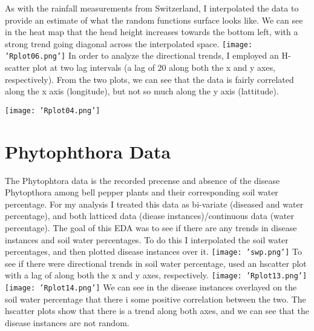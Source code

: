 \documentclass[12pt]{article}
\begin{document}
As with the rainfall measurements from Switzerland, I interpolated the data to provide an estimate of what the random functions surface looks like. We can see in the heat map that the head height increases towards the bottom left, with a strong trend going diagonal across the interpolated space.
\newline
\texttt{[image: 'Rplot06.png']}
\newline
In order to analyze the directional trends, I employed an H-scatter plot at two lag intervals (a lag of 20 along both the x and y axes, respectively). From the two plots, we can see that the data is fairly correlated along the x axis (longitude), but not so much along the y axis (lattitude).

\newline
{}
\newline
\texttt{[image: 'Rplot04.png']}
\newline

\section*{Phytophthora Data}
The Phytophtora data is the recorded precense and absence of the disease Phytopthora among bell pepper plants and their corresponding soil water percentage. For my analysis I treated this data as bi-variate (diseased and water percentage), and both latticed data (diease instances)/continuous data (water percentage). The goal of this EDA was to see if there are any trends in disease instances and soil water percentages. To do this I interpolated the soil water percentages, and then plotted disease instances over it.
\newline
\texttt{[image: 'swp.png']}
\newline
To see if there were directional trends in soil water percentage, used an hscatter plot with a lag of \1 along both the x and y axes, respectively. 
\newline
\texttt{[image: 'Rplot13.png']}
\texttt{[image: 'Rplot14.png']}
\newline
We can see in the disease instances overlayed on the soil water percentage that there i some positive correlation between the two. The hscatter plots show that there is a trend along both axes, and we can see that the disease instances are not random.
\newline
\end{document}
